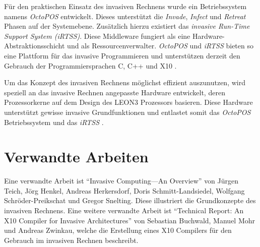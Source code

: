 Für den praktischen Einsatz des invasiven Rechnens wurde ein Betriebssystem namens \textit{OctoPOS} entwickelt.
Dieses unterstützt die \textit{Invade}, \textit{Infect} und \textit{Retreat} Phasen auf der Systemebene.
Zusätzlich hierzu existiert das \textit{invasive Run-Time Support System (iRTSS)}. Diese Middleware
fungiert als eine Hardware-Abstraktionsschicht und als Ressourcenverwalter.
\textit{OctoPOS} und \textit{iRTSS} bieten so eine Plattform für das invasive Programmieren und
unterstützen derzeit den Gebrauch der Programmiersprachen C, C++ und X10
\cite{octopos}\cite{invasiveManyCore}\cite{invasiveRISC}.

Um das Konzept des invasiven Rechnens möglichst effizient auszunutzen, wird speziell an das invasive Rechnen
angepasste Hardware entwickelt, deren Prozessorkerne auf dem Design des LEON3 Prozessors basieren.
Diese Hardware unterstützt gewisse invasive Grundfunktionen und entlastet somit das \textit{OctoPOS} Betriebssystem
und das \textit{iRTSS} \cite{invasiveArrays}.

\section{Verwandte Arbeiten}

Eine verwandte Arbeit ist "`Invasive Computing—An Overview"' \cite{invasiveOverview}
von Jürgen Teich, Jörg Henkel, Andreas Herkersdorf, Doris Schmitt-Landsiedel, Wolfgang Schröder-Preikschat
und Gregor Snelting. Diese illustriert die Grundkonzepte des invasiven Rechnens.
Eine weitere verwandte Arbeit ist "`Technical Report: An X10 Compiler for Invasive Architectures"' \cite{invasiveX10}
von Sebastian Buchwald, Manuel Mohr und Andreas Zwinkau, welche die Erstellung eines X10 Compilers für den Gebrauch 
im invasiven Rechnen beschreibt.
